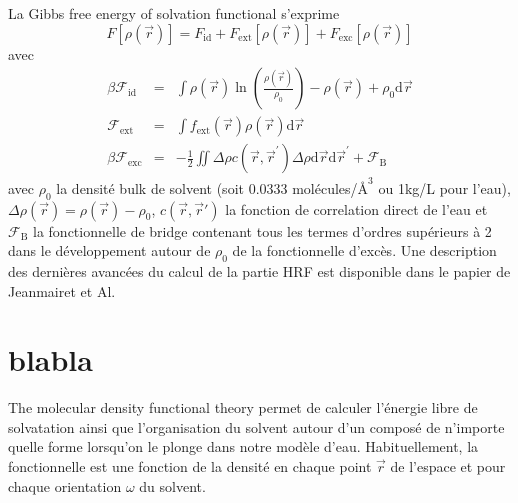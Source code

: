 La Gibbs free energy of solvation functional s'exprime 
\begin{equation} \label{eq:fonctionale_globale}
F[\rho(\vec{r})]=F_{\mathrm{id}}+F_{\mathrm{ext}}[\rho(\vec{r})]  +  F_{\mathrm{exc}}[\rho(\vec{r})]
\end{equation}
avec
\begin{eqnarray}
\beta \mathcal{F}_\mathrm{id} &=& \int \rho(\vec{r}) \ln\left(\frac{\rho(\vec{r})}{\rho_0}\right)-\rho(\vec{r})+\rho_0  \mathrm{d}\vec{r} \\
\mathcal{F}_\mathrm{ext} &=& \int  f_\mathrm{ext}(\vec{r}) \rho(\vec{r}) \mathrm{d}\vec{r} \\
\beta \mathcal{F}_\mathrm{exc} &=& -\frac{1}{2} \iint \Delta\rho c(\vec{r},\vec{r}^\prime) \Delta\rho \mathrm{d}\vec{r} \mathrm{d}\vec{r}^\prime + \mathcal{F}_\mathrm{B}
\end{eqnarray}
avec $\rho_0$ la densité bulk de solvent (soit 0.0333 molécules/$\text{\AA}^3$ ou 1kg/L pour l'eau), $\Delta\rho(\vec{r})=\rho(\vec{r})-\rho_0$, $c(\vec{r}, \vec{r}')$ la fonction de correlation direct de l'eau et $\mathcal{F}_\mathrm{B}$ la fonctionnelle de bridge contenant tous les termes d'ordres supérieurs à 2 dans le développement autour de $\rho_0$ de la fonctionnelle d'excès. Une description des dernières avancées du calcul de la partie HRF est disponible dans le papier de Jeanmairet et Al\cite{jeanmairet_molecular_2016}.





\section{blabla}
The molecular density functional theory permet de calculer l'énergie libre de solvatation ainsi que l'organisation du solvent autour d'un composé de n'importe quelle forme lorsqu'on le plonge dans notre modèle d'eau. Habituellement, la fonctionnelle est une fonction de la densité en chaque point $\vec{r}$ de l'espace et pour chaque orientation $\omega$ du solvent. 






